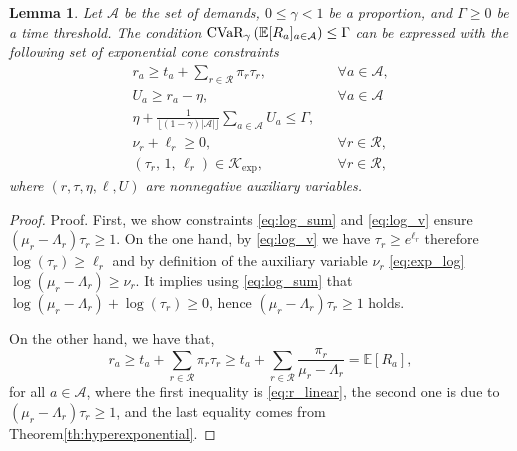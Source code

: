 \documentclass[letter,11pt, reqno]{amsart}
\newtheorem{lemma}{Lemma}
\def\E{\mathbb{E}}
\def\A{\mathcal{A}}
\begin{document}
\begin{itemize}
\begin{lemma}\label{lemma:cvar}
    Let $\A$ be the set of demands, $0\leq \gamma <1$ be a proportion, and $\Gamma\geq 0$ be a time threshold. The condition ${\rm CVaR}_\gamma\left(\E[R_a]_{a\in\A}\right)\leq \Gamma$ can be expressed with the following set of exponential cone constraints
    \begin{align}
  r_a \geq t_a + \sum_{r\in\mathcal{R}} \pi_r\tau_r, && \forall a\in\mathcal{A},
\label{eq:r_linear}\\
U_a \ge r_a-\eta, && \forall a\in\A\label{eq:var}\\
\eta + \frac{1}{\lfloor (1-\gamma)|\A|\rfloor}\sum_{a\in\mathcal{A}} U_a \le \Gamma, &&
\label{eq:cvar_constraint}\\
\nu_r + \ell_r\ge 0, &&\forall r\in\mathcal{R}, \label{eq:log_sum}\\
(\tau_r,\,1,\,\ell_r)\in \mathcal{K}_{\exp}, &&\forall r\in\mathcal{R},
\label{eq:log_v}
\end{align}
where $(r,\tau, \eta,\ell, U)$ are nonnegative auxiliary variables.
\end{lemma}

\begin{proof}{Proof.}
First, we show constraints \eqref{eq:log_sum} and \eqref{eq:log_v} ensure $(\mu_r-\Lambda_r)\tau_r\geq 1$. On the one hand, by \eqref{eq:log_v} we have $\tau_r\ge e^{\ell_r}$ therefore $\log(\tau_r)\ge \ell_r$ and by definition of the auxiliary variable $\nu_r$ \eqref{eq:exp_log} $\log(\mu_r-\Lambda_r)\ge \nu_r$. It implies using \eqref{eq:log_sum} that $\log(\mu_r-\Lambda_r)+\log(\tau_r)\ge 0$, hence $(\mu_r-\Lambda_r)\tau_r\geq 1$ holds.

On the other hand, we have that,
\begin{equation}\label{eq:auxiliary_expectations}
r_a \geq t_a + \sum_{r\in\mathcal{R}} \pi_r\tau_r \geq t_a + \sum_{r\in\mathcal{R}} \frac{\pi_r}{\mu_r-\Lambda_r}=\E[R_a],
\end{equation}
for all $a\in\A$, where the first inequality is \eqref{eq:r_linear}, the second one is due to $(\mu_r-\Lambda_r)\tau_r\geq 1$, and the last equality comes from Theorem\ref{th:hyperexponential}.


\end{proof}
\end{itemize}
\end{document}

